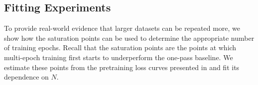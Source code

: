 

















\subsection{Fitting Experiments} \label{app:fitting experiments}
To provide real-world evidence that larger datasets can be repeated more, we show how the saturation points can be used to determine the appropriate number of training epochs. Recall that the saturation points are the points at which multi-epoch training first starts to underperform the one-pass baseline. We estimate these points from the pretraining loss curves presented in  and fit its dependence on $N$. 


